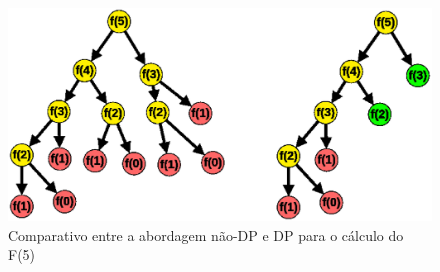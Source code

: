      \begin{figure}[htb]
        \centering
        \includegraphics[scale=0.5]{figuras/nodpxdp.eps}
        \caption{Comparativo entre a abordagem não-DP e DP para o cálculo do F(5)}
        \label{nodpxdp}
      \end{figure}
